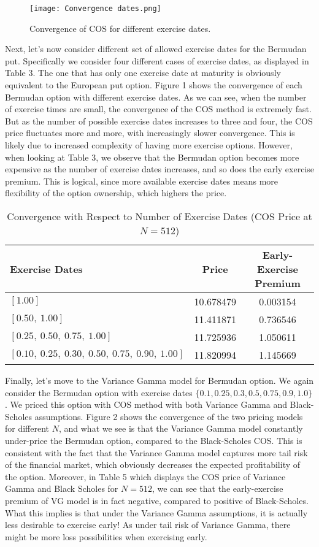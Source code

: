 \documentclass{article}
\begin{document}
\begin{figure}[h!]
    \centering
    \texttt{[image: Convergence dates.png]}
    \caption{Convergence of COS for different exercise dates.}
    \label{fig:enter-label}
\end{figure}
Next, let's now consider different set of allowed exercise dates for the Bermudan put. Specifically we consider four different cases of exercise dates, as displayed in Table 3. The one that has only one exercise date at maturity is obviously equivalent to the European put option. Figure 1 shows the convergence of each Bermudan option with different exercise dates. As we can see, when the number of exercise times are small, the convergence of the COS method is extremely fast. But as the number of possible exercise dates increases to three and four, the COS price fluctuates more and more, with increasingly slower convergence. This is likely due to increased complexity of having more exercise options. However, when looking at Table 3, we observe that the Bermudan option becomes more expensive as the number of exercise dates increases, and so does the early exercise premium. This is logical, since more available exercise dates means more flexibility of the option ownership, which highers the price. 


\begin{table}[h!]
\centering
\begin{tabular}{@{}>{}p{6.5cm}cc@{}}
\toprule
Exercise Dates & Price & Early-Exercise Premium \\
\midrule
$[1.00]$ & 10.678479 & 0.003154 \\
$[0.50,\ 1.00]$ & 11.411871 & 0.736546 \\
$[0.25,\ 0.50,\ 0.75,\ 1.00]$ & 11.725936 & 1.050611 \\
$[0.10,\ 0.25,\ 0.30,\ 0.50,\ 0.75,\ 0.90,\ 1.00]$ & 11.820994 & 1.145669 \\
\bottomrule
\end{tabular}
\caption{Convergence with Respect to Number of Exercise Dates (COS Price at $N=512$)}
\end{table}
\break
Finally, let's move to the Variance Gamma model for Bermudan option. We again consider the Bermudan option with exercise dates $\{ 0.1, 0.25, 0.3, 0.5, 0.75, 0.9, 1.0\}$. We priced this option with COS method with both Variance Gamma and Black-Scholes assumptions. Figure 2 shows the convergence of the two pricing models for different $N$, and what we see is that the Variance Gamma model constantly under-price the Bermudan option, compared to the Black-Scholes COS. This is consistent with the fact that the Variance Gamma model captures more tail risk of the financial market, which obviously decreases the expected profitability of the option. Moreover, in Table 5 which displays the COS price of Variance Gamma and Black Scholes for $N=512$, we can see that the early-exercise premium of VG model is in fact negative, compared to positive of Black-Scholes. What this implies is that under the Variance Gamma assumptions, it is actually less desirable to exercise early! As under tail risk of Variance Gamma, there might be more loss possibilities when exercising early.   
\end{document}

